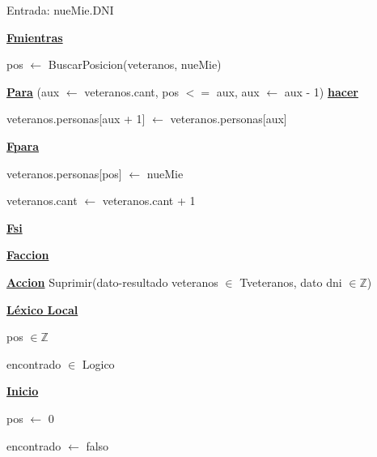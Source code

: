 \documentclass{article}
\begin{document}
                    \hspace{20mm}Entrada: nueMie.DNI

                \hspace{16mm}\underline{\textbf{Fmientras}}

                \hspace{16mm} pos $\leftarrow$ BuscarPosicion(veteranos, nueMie)

                \hspace{16mm}\underline{\textbf{Para}} (aux $\leftarrow$ veteranos.cant, pos $<=$ aux, aux $\leftarrow$ aux - 1) 
                \underline{\textbf{hacer}}

                    \hspace{20mm}veteranos.personas[aux + 1] $\leftarrow$ veteranos.personas[aux]

                \hspace{16mm}\underline{\textbf{Fpara}}

                \hspace{16mm}veteranos.personas[pos] $\leftarrow$ nueMie

                \hspace{16mm}veteranos.cant $\leftarrow$ veteranos.cant + 1

            \hspace{12mm}\underline{\textbf{Fsi}}

    \hspace{4mm}\underline{\textbf{Faccion}}

    \vspace{4mm}

    \hspace{4mm}\underline{\textbf{Accion}} Suprimir(dato-resultado veteranos $\in$ Tveteranos, dato dni $\in \mathbb{Z}$)

        \hspace{8mm}\underline{\textbf{Léxico Local}}

            \hspace{12mm}pos $\in \mathbb{Z}$

            \hspace{12mm}encontrado $\in$ Logico

        \hspace{8mm}\underline{\textbf{Inicio}}

            \hspace{12mm} pos $\leftarrow$ 0

            \hspace{12mm} encontrado $\leftarrow$ falso
\end{document}
